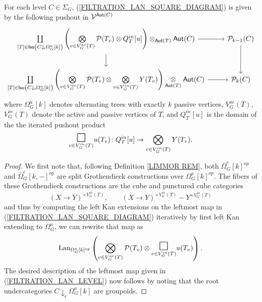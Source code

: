 \documentclass[a4paper,10pt]{article}%
\begin{document}
\begin{proposition}
For each level $C\in \Sigma_G$,
(\ref{FILTRATION_LAN_SQUARE_DIAGRAM})
is given by the following pushout in $\mathcal V^{\mathsf{Aut}(C)}$
\begin{equation}\label{FILTRATION_LAN_LEVEL}
\begin{tikzcd}
	\coprod\limits_{[T] \in \mathsf{Iso}
		\left(C \downarrow_{\mathsf{r}} \Omega_G^a[k]\right)}
	\left(
		\bigotimes\limits_{v \in V_{G}^{ac}(T)}\P(T_v) \otimes
		Q_T^{in}[u]
	\right)
		\otimes_{\mathsf{Aut}(T)} \mathsf{Aut}(C)
	\arrow[r] \arrow[d] &
	\P_{k-1}(C) \arrow[d] 
\\
	\coprod\limits_{[T] \in \mathsf{Iso}
		\left(C \downarrow_{\mathsf{r}} \Omega_G^a[k]\right)}
	\left(
		\bigotimes\limits_{v \in V_{G}^{ac}(T)}\P(T_v) \otimes
		\bigotimes\limits_{v \in V_{G}^{in}(T)} Y(T_v)
	\right)
		\underset{\mathsf{Aut}(T)}{\otimes} \mathsf{Aut}(C)
	\arrow[r] &
	\P_k(C)
\end{tikzcd}
\end{equation}
where $\Omega_G^a[k]$ denotes alternating trees with exactly $k$ 
passive vertices, $ V_{G}^{ac}(T)$, $V_{G}^{in}(T)$ denote the active and passive vertices of $T$,
and $Q_T^{in}[u]$ is the domain 
of the the iterated pushout product
\[
		\underset{v \in V_G^{in}(T)}
		{\mathlarger{\mathlarger{\mathlarger{\square}}}}u(T_v)
	\colon
		Q_T^{in}[u] \to
		\bigotimes\limits_{v \in V_{G}^{in}(T)} Y(T_v).
\]
\end{proposition}


\begin{proof}
We first note that, following 
Definition \ref{LIMMOR REM}, both 
$\bar{\Omega}_{G}^e[k]^{op}$ and $\bar{\Omega}_{G}^e[k,-]^{op}$
are split Grothendieck constructions over
$\Omega_G^a[k]^{op}$.
The fibers of these Grothendieck constructions
are the cube and punctured cube categories
\[
	(X \to Y)^{\times V_G^{in}(T)},
\qquad
	(X \to Y)^{\times V_G^{in}(T)} - Y^{\times V_G^{in}(T)}
\]
and thus by computing the left Kan extensions on the leftmost map in (\ref{FILTRATION_LAN_SQUARE_DIAGRAM}) iteratively by first left Kan extending to $\Omega_G^a$, we can rewrite that map as
\begin{equation}\label{FILTINTALT EQ}
	\Lan_{\Omega_G^a[k]^{op}}
	\left(
		\bigotimes\limits_{v \in V_{G}^{ac}(T)}\P(T_v) \otimes
		\underset{v \in V_{G}^{in}(T)}
		{\mathlarger{\mathlarger{\mathlarger{\square}}}}
		u(T_v)
	\right).
\end{equation}
The desired description of the leftmost map given in (\ref{FILTRATION_LAN_LEVEL})
now follows by noting that the root undercategories
$C \downarrow_{\mathsf{r}} \Omega_G^a[k]$
are groupoids.
\end{proof}
\end{document}
